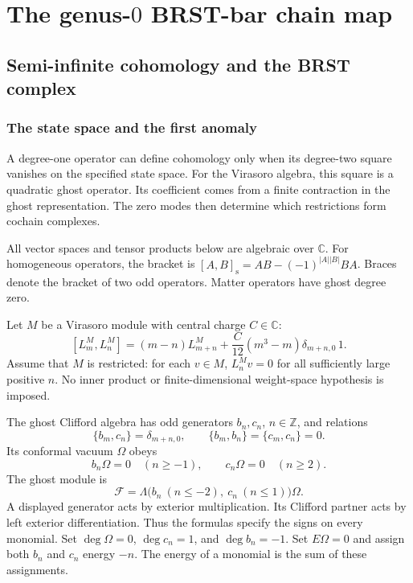 \section{The genus-\texorpdfstring{$0$}{0} BRST-bar chain map}
\label{sec:brst-bar-chain-map}

\subsection{Semi-infinite cohomology and the BRST complex}

\subsubsection{The state space and the first anomaly}

A degree-one operator can define cohomology only when its degree-two square vanishes on the specified state space.
For the Virasoro algebra, this square is a quadratic ghost operator.
Its coefficient comes from a finite contraction in the ghost representation.
The zero modes then determine which restrictions form cochain complexes.

All vector spaces and tensor products below are algebraic over $\mathbb C$.
For homogeneous operators, the bracket is
$[A,B]_{\mathrm s}=AB-(-1)^{|A||B|}BA$.
Braces denote the bracket of two odd operators.
Matter operators have ghost degree zero.

Let $M$ be a Virasoro module with central charge $C\in\mathbb C$:
\begin{equation}\label{eq:vir-matter-relation}
 [L_m^M,L_n^M]=(m-n)L_{m+n}^M+
 \frac{C}{12}(m^3-m)\delta_{m+n,0}\,1.
\end{equation}
Assume that $M$ is restricted: for each $v\in M$, $L_n^Mv=0$ for all sufficiently large positive $n$.
No inner product or finite-dimensional weight-space hypothesis is imposed.

The ghost Clifford algebra has odd generators $b_n,c_n$, $n\in\mathbb Z$, and relations
\[
 \{b_m,c_n\}=\delta_{m+n,0},\qquad
 \{b_m,b_n\}=\{c_m,c_n\}=0.
\]
Its conformal vacuum $\Omega$ obeys
\begin{equation}\label{eq:vir-ghost-vacuum}
 b_n\Omega=0\quad(n\geq-1),\qquad
 c_n\Omega=0\quad(n\geq2).
\end{equation}
The ghost module is
\[
 \mathcal F=\Lambda\bigl(b_n\ (n\leq-2),\ c_n\ (n\leq1)\bigr)\Omega.
\]
A displayed generator acts by exterior multiplication.
Its Clifford partner acts by left exterior differentiation.
Thus the formulas specify the signs on every monomial.
Set $\deg\Omega=0$, $\deg c_n=1$, and $\deg b_n=-1$.
Set $E\Omega=0$ and assign both $b_n$ and $c_n$ energy $-n$.
The energy of a monomial is the sum of these assignments.

